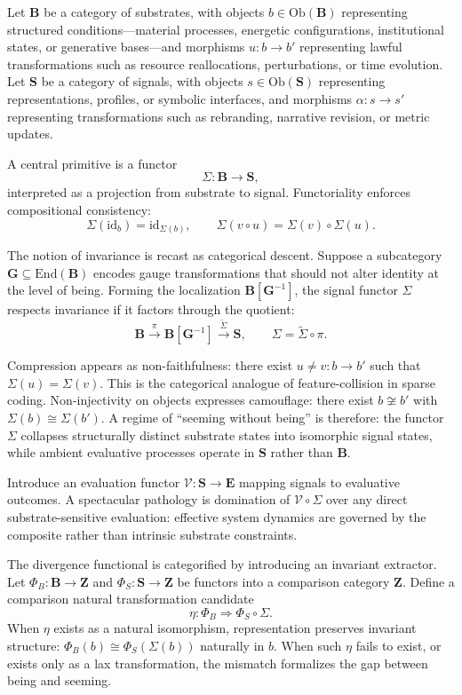 \documentclass[11pt]{article}
\begin{document}
Let $\mathbf{B}$ be a category of substrates, with objects $b \in \mathrm{Ob}(\mathbf{B})$ representing structured conditions---material processes, energetic configurations, institutional states, or generative bases---and morphisms $u : b \to b'$ representing lawful transformations such as resource reallocations, perturbations, or time evolution. Let $\mathbf{S}$ be a category of signals, with objects $s \in \mathrm{Ob}(\mathbf{S})$ representing representations, profiles, or symbolic interfaces, and morphisms $\alpha : s \to s'$ representing transformations such as rebranding, narrative revision, or metric updates.

A central primitive is a functor
\[
\Sigma : \mathbf{B} \to \mathbf{S},
\]
interpreted as a projection from substrate to signal. Functoriality enforces compositional consistency:
\[
\Sigma(\mathrm{id}_b) = \mathrm{id}_{\Sigma(b)}, \qquad \Sigma(v \circ u) = \Sigma(v) \circ \Sigma(u).
\]

The notion of invariance is recast as categorical descent. Suppose a subcategory $\mathbf{G} \subseteq \mathrm{End}(\mathbf{B})$ encodes gauge transformations that should not alter identity at the level of being. Forming the localization $\mathbf{B}[\mathbf{G}^{-1}]$, the signal functor $\Sigma$ respects invariance if it factors through the quotient:
\[
\mathbf{B} \xrightarrow{\pi} \mathbf{B}[\mathbf{G}^{-1}] \xrightarrow{\widetilde{\Sigma}} \mathbf{S}, \qquad \Sigma = \widetilde{\Sigma} \circ \pi.
\]

Compression appears as non-faithfulness: there exist $u \ne v : b \to b'$ such that $\Sigma(u) = \Sigma(v)$. This is the categorical analogue of feature-collision in sparse coding. Non-injectivity on objects expresses camouflage: there exist $b \not\cong b'$ with $\Sigma(b) \cong \Sigma(b')$. A regime of ``seeming without being'' is therefore: the functor $\Sigma$ collapses structurally distinct substrate states into isomorphic signal states, while ambient evaluative processes operate in $\mathbf{S}$ rather than $\mathbf{B}$.

Introduce an evaluation functor $\mathcal{V} : \mathbf{S} \to \mathbf{E}$ mapping signals to evaluative outcomes. A spectacular pathology is domination of $\mathcal{V} \circ \Sigma$ over any direct substrate-sensitive evaluation: effective system dynamics are governed by the composite rather than intrinsic substrate constraints.

The divergence functional is categorified by introducing an invariant extractor. Let $\Phi_B : \mathbf{B} \to \mathbf{Z}$ and $\Phi_S : \mathbf{S} \to \mathbf{Z}$ be functors into a comparison category $\mathbf{Z}$. Define a comparison natural transformation candidate
\[
\eta : \Phi_B \Rightarrow \Phi_S \circ \Sigma.
\]
When $\eta$ exists as a natural isomorphism, representation preserves invariant structure: $\Phi_B(b) \cong \Phi_S(\Sigma(b))$ naturally in $b$. When such $\eta$ fails to exist, or exists only as a lax transformation, the mismatch formalizes the gap between being and seeming.
\end{document}
